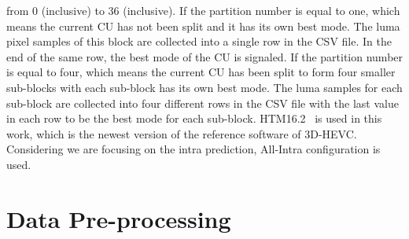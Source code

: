 from 0 (inclusive) to 36 (inclusive).
If the partition number is equal to one, which means the current CU has not
been split and it has its own best mode.
The luma pixel samples of this block are collected into a single row in the
CSV file.
In the end of the same row, the best mode of the CU is signaled.
If the partition number is equal to four, which means the current CU has been
split to form four smaller sub-blocks with each sub-block has its
own best mode.
The luma samples for each sub-block are collected into four different rows
in the CSV file with the last value in each row to be the best mode for each
sub-block.
HTM16.2~\parencite{RN214} is used in this work, which is the newest
version of the reference software of 3D-HEVC\@.
Considering we are focusing on the intra prediction,
All-Intra configuration is used.

\section{Data Pre-processing}\label{sec:data-preprocessing}

